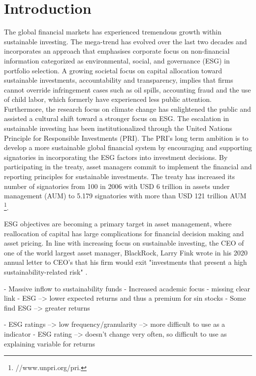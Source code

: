\section{Introduction} \label{sec:intro}
The global financial markets has experienced tremendous growth within sustainable investing. The mega-trend has evolved over the last two decades and incorporates an approach that emphasises corporate focus on non-financial information categorized as environmental, social, and governance (ESG) in portfolio selection. A growing societal focus on capital allocation toward sustainable investments, accountability and transparency, implies that firms cannot override infringement cases such as oil spills, accounting fraud and the use of child labor, which formerly have experienced less public attention. Furthermore, the research focus on climate change has enlightened the public and assisted a cultural shift toward a stronger focus on ESG. The escalation in sustainable investing has been institutionalized through the United Nations Principle for Responsible Investments (PRI). The PRI's long term ambition is to develop a more sustainable global financial system by encouraging and supporting signatories in incorporating the ESG factors into investment decisions. By participating in the treaty, asset managers commit to implement the financial and reporting principles for sustainable investments. The treaty has increased its number of signatories from 100 in 2006 with USD 6 trillion in assets under management (AUM) to 5.179 signatories with more than USD 121 trillion AUM \footnote{//www.unpri.org/pri.}. 

ESG objectives are becoming a primary target in asset management, where reallocation of capital has large complications for financial decision making and asset pricing. In line with increasing focus on sustainable investing, the CEO of one of the world largest asset manager, BlackRock, Larry Fink wrote in his 2020 annual letter to CEO's that his firm would exit "investments that present a high sustainability-related risk" \citep{Blackrock}. 


- Massive inflow to sustainability funds
- Increased academic focus
- missing clear link
- ESG --> lower expected returns and thus a premium for sin stocks
- Some find ESG --> greater returns


- ESG ratings --> low frequency/granularity --> more difficult to use as a indicator
- ESG rating --> doesn't change very often, so difficult to use as explaining variable for returns


